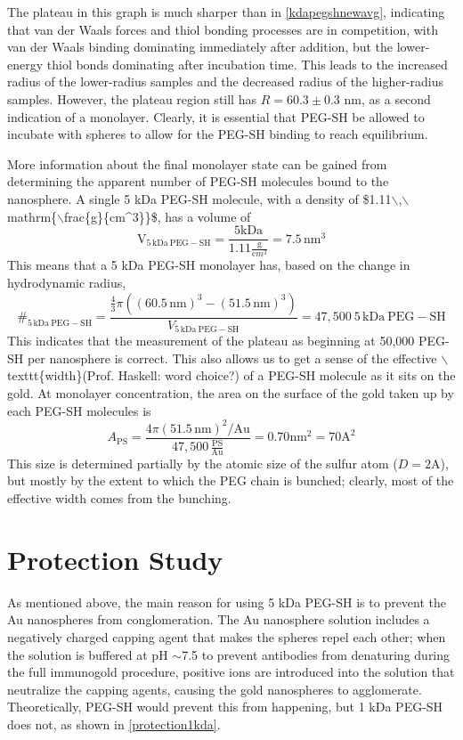 The plateau in this graph is much sharper than in \autoref{kdapegshnewavg}, indicating that van der Waals forces and thiol bonding processes are in competition, with van der Waals binding dominating immediately after addition, but the lower-energy thiol bonds dominating after incubation time. This leads to the increased radius of the lower-radius samples and the decreased radius of the higher-radius samples. However, the plateau region still has $R=60.3\pm0.3$ nm, as a second indication of a monolayer. Clearly, it is essential that PEG-SH be allowed to incubate with spheres to allow for the PEG-SH binding to reach equilibrium.

More information about the final monolayer state can be gained from determining the apparent number of PEG-SH molecules bound to the nanosphere. A single 5 kDa PEG-SH molecule, with a density of \$1.11$\backslash$,$\backslash$mathrm\{$\backslash$frac\{g\}\{cm\^{}3\}\}\$, has a volume of
\[\mathrm{V_{5\,kDa\ PEG-SH}}
=\frac{5\mathrm{kDa}}{1.11\frac{\mathrm g}{\mathrm cm^3}}=7.5\mathrm{\,nm^3}\]
This means that a 5 kDa PEG-SH monolayer has, based on the change in hydrodynamic radius,
\[\#_{\mathrm{5\,kDa\ PEG-SH}}=
\frac{\frac{4}{3}\pi((60.5\mathrm{\,nm})^3-(51.5\mathrm{\,nm})^3)} {V_{\mathrm{5\,kDa\ PEG-SH}}}=47,500\mathrm{\ 5\,kDa\ PEG-SH}\]
This indicates that the measurement of the plateau as beginning at 50,000 PEG-SH per nanosphere is correct. This also allows us to get a sense of the effective $\backslash$texttt\{width\}(Prof. Haskell: word choice?) of a PEG-SH molecule as it sits on the gold. At monolayer concentration, the area on the surface of the gold taken up by each PEG-SH molecules is
\[A_{\mathrm{PS}}=\frac{4\pi(51.5\mathrm{\,nm})^2/\mathrm{Au}} {47,500\,\mathrm{\frac{PS}{Au}}}=0.70\mathrm{nm}^2=70\mathrm{A}^2\]
This size is determined partially by the atomic size of the sulfur atom ($D=2\mathrm{A}$), but mostly by the extent to which the PEG chain is bunched; clearly, most of the effective width comes from the bunching.

\section{Protection Study}
\label{protectionstudy}

As mentioned above, the main reason for using 5 kDa PEG-SH is to prevent the Au nanospheres from conglomeration. The Au nanosphere solution includes a negatively charged capping agent that makes the spheres repel each other; when the solution is buffered at pH \ensuremath{\sim}7.5 to prevent antibodies from denaturing during the full immunogold procedure, positive ions are introduced into the solution that neutralize the capping agents, causing the gold nanospheres to agglomerate. Theoretically, PEG-SH would prevent this from happening, but 1 kDa PEG-SH does not, as shown in \autoref{protection1kda}.

